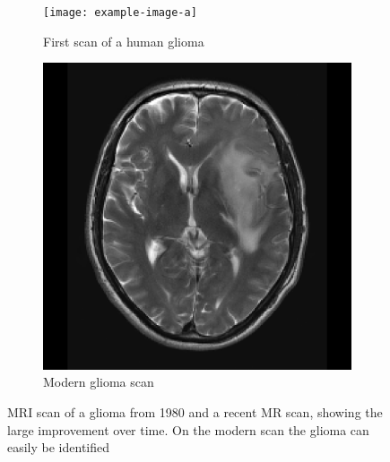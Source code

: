 \begin{figure}[hbt]
    \centering
    \begin{subfigure}[b]{0.45\textwidth}
        \centering
        \texttt{[image: example-image-a]}
        \caption{First scan of a human glioma}\label{fig:intro_MR_first}
    \end{subfigure}
    \begin{subfigure}[b]{0.45\textwidth}
        \centering
        \includegraphics[width=\textwidth]{Figures/T2_LGG.png}
        \caption{Modern glioma scan}\label{fig:intro_MR_modern}
    \end{subfigure}
    \caption{\acrshort{MRI} scan of a glioma from 1980 and a recent \acrshort{MR} scan, showing the large improvement over time. On the modern scan the glioma can easily be identified}\label{fig:intro_MR_comparison}
\end{figure}


